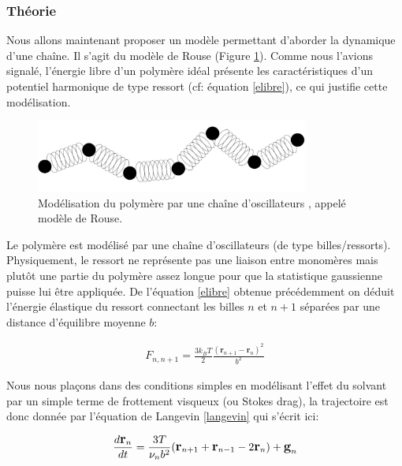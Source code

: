 \subsubsection{Théorie}

Nous allons maintenant proposer un modèle permettant d'aborder la dynamique d'une chaîne. Il s'agit du modèle de Rouse (Figure \ref{rouse}). Comme nous l'avions signalé, l'énergie libre d'un polymère idéal présente les caractéristiques d'un potentiel harmonique de type ressort (cf: équation \ref{elibre}), ce qui justifie cette modélisation.

\begin{figure}[H]
\begin{center}
\includegraphics[width=0.8\textwidth]{rouse.jpg}

\caption[Modèle de Rouse]{Modélisation du polymère par une chaîne d'oscillateurs \cite{these}, appelé modèle de Rouse.}
\label{rouse}
\end{center}
\end{figure}

Le polymère est modélisé par une chaîne d'oscillateurs (de type billes/ressorts). Physiquement, le ressort ne représente pas une liaison entre monomères mais plutôt une partie du polymère assez longue pour que la statistique gaussienne puisse lui être appliquée. De l'équation \ref{elibre} obtenue précédemment on déduit l'énergie élastique du ressort connectant les billes $n$ et $n+1$ séparées par une distance d'équilibre moyenne $b$:


\begin{eqnarray}
F_{n,n+1} = \frac{3 k_B T}{2} \frac{(\textbf{r}_{n+1}-\textbf{r}_n)^2}{b^2}
\end{eqnarray}

Nous nous plaçons dans des conditions simples en modélisant l'effet du solvant par un simple terme de frottement visqueux (ou Stokes drag), la trajectoire est donc donnée par l'équation de Langevin \ref{langevin} qui s'écrit ici:

\begin{eqnarray}
\large{
\frac{d \textbf{r}_n}{dt} =  \frac{3T}{\nu_n b^2}( \textbf{r}_{n+1} +\textbf{r}_{n-1} -2\textbf{r}_n )  + \textbf{g}_n}
\end{eqnarray}

